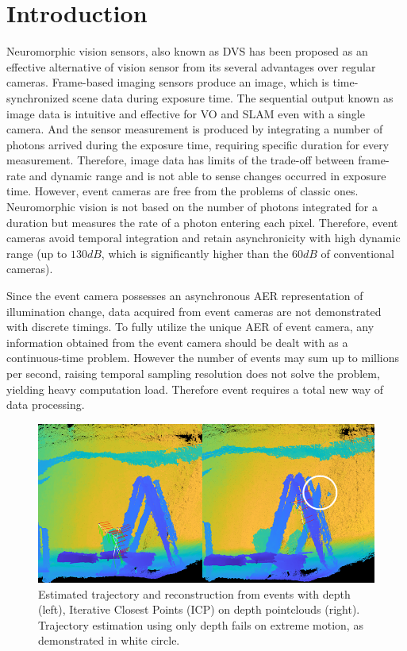 \section{Introduction}
\label{sec:Event}

Neuromorphic vision sensors, also known as \ac{DVS} \cite{lichtsteiner2008128x128} has been proposed as an effective alternative of vision sensor from its several advantages over regular cameras. Frame-based imaging sensors produce an image, which is time-synchronized scene data during exposure time. The sequential output known as image data is intuitive and effective for \ac{VO} \cite{forster2014svo} and \ac{SLAM} \cite{mur2017orb} even with a single camera. And the sensor measurement is produced by integrating a number of photons arrived during the exposure time, requiring specific duration for every measurement. Therefore, image data has limits of the trade-off between frame-rate and dynamic range and is not able to sense changes occurred in exposure time. However, event cameras are free from the problems of classic ones. Neuromorphic vision is not based on the number of photons integrated for a duration but measures the rate of a photon entering each pixel. Therefore, event cameras avoid temporal integration and retain asynchronicity with high dynamic range (up to $130dB$, which is significantly higher than the $60dB$ of conventional cameras).

Since the event camera possesses an asynchronous \ac{AER} representation of illumination change, data acquired from event cameras are not demonstrated with discrete timings. To fully utilize the unique \ac{AER} of event camera, any information obtained from the event camera should be dealt with as a continuous-time problem. However the number of events may sum up to millions per second, raising temporal sampling resolution does not solve the problem, yielding heavy computation load. Therefore event requires a total new way of data processing.

\begin{figure}%
	\centering%
	\includegraphics[width = \columnwidth]{figures/figure1small}%
	\captionsetup{justification=centering}
	\caption{Estimated trajectory and reconstruction from events \protect\linebreak with depth (left), Iterative
		Closest Points (ICP) on depth pointclouds (right). Trajectory estimation using only depth fails on extreme motion, as demonstrated in white circle.}%
	\label{F:main}%
	\vspace{-5mm}
\end{figure}

